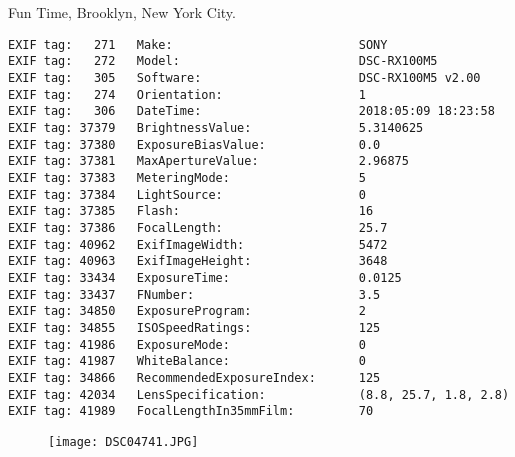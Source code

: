\section{\protect{}}
\noindent Fun Time, Brooklyn, New York City.
\noindent
\begin{lstlisting}
EXIF tag:   271   Make:                          SONY
EXIF tag:   272   Model:                         DSC-RX100M5
EXIF tag:   305   Software:                      DSC-RX100M5 v2.00
EXIF tag:   274   Orientation:                   1
EXIF tag:   306   DateTime:                      2018:05:09 18:23:58
EXIF tag: 37379   BrightnessValue:               5.3140625
EXIF tag: 37380   ExposureBiasValue:             0.0
EXIF tag: 37381   MaxApertureValue:              2.96875
EXIF tag: 37383   MeteringMode:                  5
EXIF tag: 37384   LightSource:                   0
EXIF tag: 37385   Flash:                         16
EXIF tag: 37386   FocalLength:                   25.7
EXIF tag: 40962   ExifImageWidth:                5472
EXIF tag: 40963   ExifImageHeight:               3648
EXIF tag: 33434   ExposureTime:                  0.0125
EXIF tag: 33437   FNumber:                       3.5
EXIF tag: 34850   ExposureProgram:               2
EXIF tag: 34855   ISOSpeedRatings:               125
EXIF tag: 41986   ExposureMode:                  0
EXIF tag: 41987   WhiteBalance:                  0
EXIF tag: 34866   RecommendedExposureIndex:      125
EXIF tag: 42034   LensSpecification:             (8.8, 25.7, 1.8, 2.8)
EXIF tag: 41989   FocalLengthIn35mmFilm:         70

\end{lstlisting}
\clearpage
\begin{figure}
\raggedleft
\texttt{[image: DSC04741.JPG]}
\end{figure}


\clearpage
